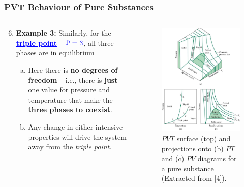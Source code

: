 \documentclass[10pt,compress]{beamer}
\begin{document}
\begin{frame}
 \frametitle{PVT Behaviour of Pure Substances}
 \begin{columns}
    \begin{column}[l]{0.5\linewidth}
      \begin{enumerate}\setcounter{enumi}{5}\scriptsize
         \item <1-> {\bf Example 3:} Similarly, for the \textcolor{blue}{\underline{\bf triple point}} -- $\textcolor{blue}{\mathcal{P}=3}$, all three phases are in equilibrium
           \begin{enumerate}[(a)]\scriptsize
              \item <1-> Here there is {\bf no degrees of freedom} -- i.e., there is {\bf just} one value for pressure and temperature that make the {\bf three phases to coexist}.
              \item <2-> Any change in either intensive properties will drive the system away from the {\it triple point}.
           \end{enumerate}
     \end{enumerate}
  \end{column}
  \begin{column}[l]{0.5\linewidth}
   \begin{figure}%
    \begin{center}
     \includegraphics[width=4.cm,clip]{./Pics/PVT_Surface.jpg}
    \end{center}
    \scriptsize\caption{\scriptsize$PVT$ surface (top) and projections onto (b) $PT$ and (c) $PV$ diagrams for a pure substance (Extracted from [4]).}
   \end{figure}    
  \end{column}
 \end{columns}
\end{frame}
\end{document}
